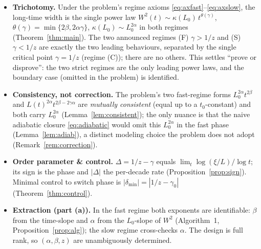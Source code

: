 \documentclass{amsart}
\theoremstyle{definition}
\newcommand{\asymp}{\sim}
\begin{document}
\begin{itemize}
\item \textbf{Trichotomy.} Under the problem's regime axioms
  \eqref{eq:axfast}--\eqref{eq:axslow}, the long-time width is the single power law
  $W^2(t)\asymp\kappa(L_0)\,t^{\theta(\gamma)}$,
  $\theta(\gamma)=\min\{2\beta,2\alpha\gamma\}$, $\kappa(L_0)\asymp L_0^{2\alpha}$
  in both regimes (Theorem~\ref{thm:main}). The two announced regimes (F)
  $\gamma>1/z$ and (S) $\gamma<1/z$ are exactly the two leading behaviours,
  separated by the single critical point $\gamma=1/z$ (regime (C)); there are no
  others. This settles ``prove or disprove'': the two strict regimes are the only
  leading power laws, and the boundary case (omitted in the problem) is identified.
\item \textbf{Consistency, not correction.} The problem's two fast-regime forms
  $L_0^{2\alpha}t^{2\beta}$ and $L(t)^{2\alpha}t^{2\beta-2\gamma\alpha}$ are
  \emph{mutually consistent} (equal up to a $t_0$-constant) and both carry
  $L_0^{2\alpha}$ (Lemma~\ref{lem:consistent}); the only nuance is that the
  naive adiabatic closure \eqref{eq:adiabatic} would omit this $L_0^{2\alpha}$ in
  the fast phase (Lemma~\ref{lem:adiab}), a distinct modeling choice the problem
  does not adopt (Remark~\ref{rem:correction}).
\item \textbf{Order parameter \& control.} $\Delta=1/z-\gamma$ equals
  $\lim_t\log(\xi/L)/\log t$; its sign is the phase and $|\Delta|$ the per-decade
  rate (Proposition~\ref{prop:sign}). Minimal control to switch phase is
  $|\delta_{\min}|=|1/z-\gamma_0|$ (Theorem~\ref{thm:control}).
\item \textbf{Extraction (part (a)).} In the fast regime both exponents are
  identifiable: $\beta$ from the time-slope and $\alpha$ from the $L_0$-slope of
  $W^2$ (Algorithm~1, Proposition~\ref{prop:alg}); the slow regime cross-checks
  $\alpha$. The design is full rank, so $(\alpha,\beta,z)$ are unambiguously
  determined.
\end{itemize}
\end{document}
